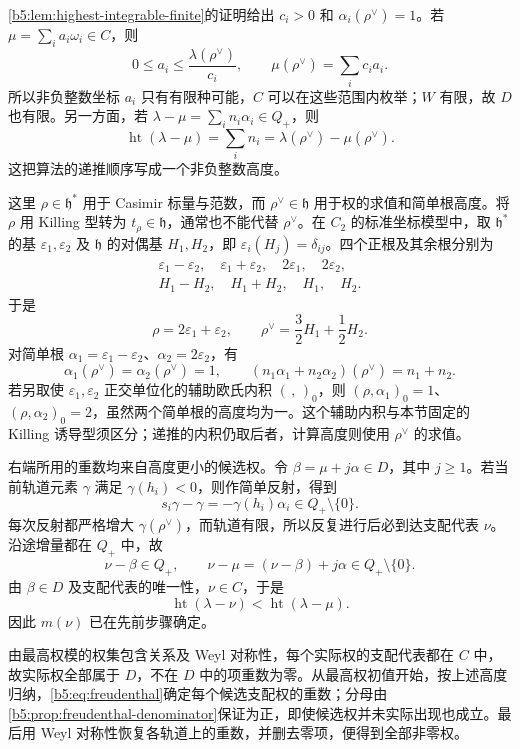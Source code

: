 \cref{b5:lem:highest-integrable-finite}的证明给出 \(c_i>0\) 和 \(\alpha_i(\rho^\vee)=1\)。若 \(\mu=\sum_i a_i\omega_i\in C\)，则
\[
	0\le a_i\le\frac{\lambda(\rho^\vee)}{c_i},\qquad \mu(\rho^\vee)=\sum_i c_i a_i.
\]
所以非负整数坐标 \(a_i\) 只有有限种可能，\(C\) 可以在这些范围内枚举；\(W\) 有限，故 \(D\) 也有限。另一方面，若 \(\lambda-\mu=\sum_i n_i\alpha_i\in Q_+\)，则
\[
	\operatorname{ht}(\lambda-\mu)=\sum_i n_i =\lambda(\rho^\vee)-\mu(\rho^\vee).
\]
这把算法的递推顺序写成一个非负整数高度。

\ProseParagraphBreak
这里 \(\rho\in\mathfrak h^*\) 用于 Casimir 标量与范数，而 \(\rho^\vee\in\mathfrak h\) 用于权的求值和简单根高度。将 \(\rho\) 用 Killing 型转为 \(t_\rho\in\mathfrak h\)，通常也不能代替 \(\rho^\vee\)。在 \(C_2\) 的标准坐标模型中，取 \(\mathfrak h^*\) 的基 \(\varepsilon_1,\varepsilon_2\) 及 \(\mathfrak h\) 的对偶基 \(H_1,H_2\)，即 \(\varepsilon_i(H_j)=\delta_{ij}\)。四个正根及其余根分别为
\[
	\begin{gathered}
		\varepsilon_1-\varepsilon_2,\quad \varepsilon_1+\varepsilon_2, \quad 2\varepsilon_1,\quad 2\varepsilon_2,\\
		H_1-H_2,\quad H_1+H_2,\quad H_1,\quad H_2.
	\end{gathered}
\]
于是
\[
	\rho=2\varepsilon_1+\varepsilon_2,\qquad \rho^\vee=\dfrac32H_1+\dfrac12H_2.
\]
对简单根 \(\alpha_1=\varepsilon_1-\varepsilon_2\)、\(\alpha_2=2\varepsilon_2\)，有
\[
	\alpha_1(\rho^\vee)=\alpha_2(\rho^\vee)=1,\qquad (n_1\alpha_1+n_2\alpha_2)(\rho^\vee)=n_1+n_2.
\]
若另取使 \(\varepsilon_1,\varepsilon_2\) 正交单位化的辅助欧氏内积 \((\, ,\,)_0\)，则 \((\rho,\alpha_1)_0=1\)、\((\rho,\alpha_2)_0=2\)，虽然两个简单根的高度均为一。这个辅助内积与本节固定的 Killing 诱导型须区分；递推的内积仍取后者，计算高度则使用 \(\rho^\vee\) 的求值。

\ProseParagraphBreak
右端所用的重数均来自高度更小的候选权。令 \(\beta=\mu+j\alpha\in D\)，其中 \(j\ge1\)。若当前轨道元素 \(\gamma\) 满足 \(\gamma(h_i)<0\)，则作简单反射，得到
\[
	s_i\gamma-\gamma=-\gamma(h_i)\alpha_i\in Q_+\setminus\{0\}.
\]
每次反射都严格增大 \(\gamma(\rho^\vee)\)，而轨道有限，所以反复进行后必到达支配代表 \(\nu\)。沿途增量都在 \(Q_+\) 中，故
\[
	\nu-\beta\in Q_+,\qquad \nu-\mu=(\nu-\beta)+j\alpha\in Q_+\setminus\{0\}.
\]
由 \(\beta\in D\) 及支配代表的唯一性，\(\nu\in C\)，于是
\[
	\operatorname{ht}(\lambda-\nu) <\operatorname{ht}(\lambda-\mu).
\]
因此 \(m(\nu)\) 已在先前步骤确定。

\ProseParagraphBreak
由最高权模的权集包含关系及 Weyl 对称性，每个实际权的支配代表都在 \(C\) 中，故实际权全部属于 \(D\)，不在 \(D\) 中的项重数为零。从最高权初值开始，按上述高度归纳，\eqref{b5:eq:freudenthal}确定每个候选支配权的重数；分母由\cref{b5:prop:freudenthal-denominator}保证为正，即使候选权并未实际出现也成立。最后用 Weyl 对称性恢复各轨道上的重数，并删去零项，便得到全部非零权。

